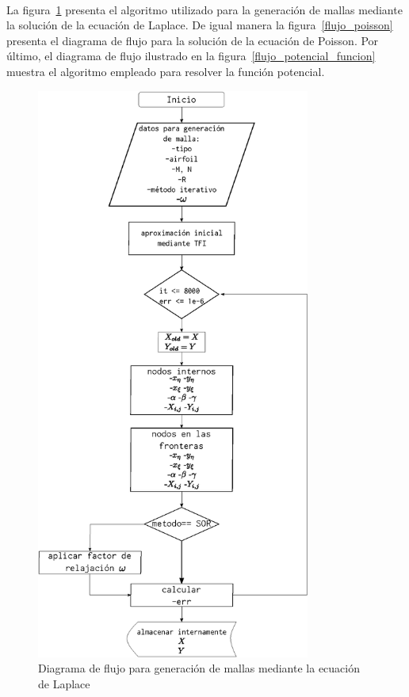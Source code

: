 \documentclass[letterpaper, openright, 12pt]{book}
\begin{document}
    \paragraph*{}
        La figura~\ref{flujo_laplace} presenta el algoritmo utilizado para la
        generación de mallas mediante la solución de la ecuación de Laplace.
        De igual manera la figura~\ref{flujo_poisson} presenta el diagrama
        de flujo para la solución de la ecuación de Poisson. Por último, el
        diagrama de flujo ilustrado en la figura~\ref{flujo_potencial_funcion}
        muestra el algoritmo empleado para resolver la función potencial.

    \begin{figure}[htbp!]
        \centering
        \includegraphics[keepaspectratio, width=90mm]{./Imagenes/flujo_laplace}
        \caption{Diagrama de flujo para generación de mallas mediante la
            ecuación de Laplace}
        \label{flujo_laplace}
    \end{figure}
\end{document}
